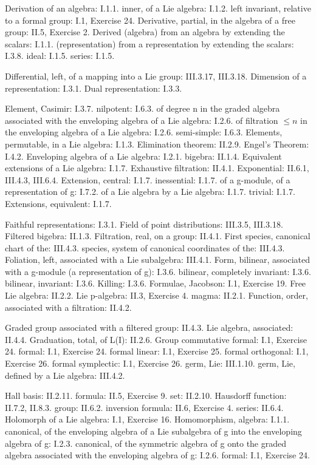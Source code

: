 Derivation of an algebra: I.1.1. inner, of a Lie algebra: I.1.2. left invariant, relative to a formal group: I.1, Exercise 24. Derivative, partial, in the algebra of a free group: II.5, Exercise 2. Derived (algebra) from an algebra by extending the scalars: I.1.1. (representation) from a representation by extending the scalars: I.3.8. ideal: I.1.5. series: I.1.5.

Differential, left, of a mapping into a Lie group: III.3.17, III.3.18. Dimension of a representation: I.3.1. Dual representation: I.3.3.

Element, Casimir: I.3.7. nilpotent: I.6.3. of degree n in the graded algebra associated with the enveloping algebra of a Lie algebra: I.2.6. of filtration \(\leqslant n\) in the enveloping algebra of a Lie algebra: I.2.6. semi-simple: I.6.3. Elements, permutable, in a Lie algebra: I.1.3. Elimination theorem: II.2.9. Engel's Theorem: I.4.2. Enveloping algebra of a Lie algebra: I.2.1. bigebra: II.1.4. Equivalent extensions of a Lie algebra: I.1.7. Exhaustive filtration: II.4.1. Exponential: II.6.1, III.4.3, III.6.4. Extension, central: I.1.7. inessential: I.1.7. of a g-module, of a representation of g: I.7.2. of a Lie algebra by a Lie algebra: I.1.7. trivial: I.1.7. Extensions, equivalent: I.1.7.

Faithful representations: I.3.1. Field of point distributions: III.3.5, III.3.18. Filtered bigebra: II.1.3. Filtration, real, on a group: II.4.1. First species, canonical chart of the: III.4.3. species, system of canonical coordinates of the: III.4.3. Foliation, left, associated with a Lie subalgebra: III.4.1. Form, bilinear, associated with a g-module (a representation of g): I.3.6. bilinear, completely invariant: I.3.6. bilinear, invariant: I.3.6. Killing: I.3.6. Formulae, Jacobson: I.1, Exercise 19. Free Lie algebra: II.2.2. Lie p-algebra: II.3, Exercise 4. magma: II.2.1. Function, order, associated with a filtration: II.4.2.

Graded group associated with a filtered group: II.4.3. Lie algebra, associated: II.4.4. Graduation, total, of L(I): II.2.6. Group commutative formal: I.1, Exercise 24. formal: I.1, Exercise 24. formal linear: I.1, Exercise 25. formal orthogonal: I.1, Exercise 26. formal symplectic: I.1, Exercise 26. germ, Lie: III.1.10. germ, Lie, defined by a Lie algebra: III.4.2.

Hall basis: II.2.11. formula: II.5, Exercise 9. set: II.2.10. Hausdorff function: II.7.2, II.8.3. group: II.6.2. inversion formula: II.6, Exercise 4. series: II.6.4. Holomorph of a Lie algebra: I.1, Exercise 16. Homomorphism, algebra: I.1.1. canonical, of the enveloping algebra of a Lie subalgebra of g into the enveloping algebra of g: I.2.3. canonical, of the symmetric algebra of g onto the graded algebra associated with the enveloping algebra of g: I.2.6. formal: I.1, Exercise 24.

